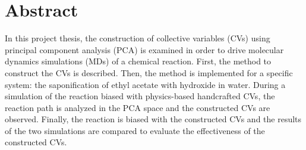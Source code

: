 \chapter*{Abstract}

In this project thesis, the construction of collective variables (CVs) using principal component analysis (PCA) is examined in order to drive molecular dynamics simulations (MDs) of a chemical reaction.
First, the method to construct the CVs is described. 
Then, the method is implemented for a specific system: the saponification of ethyl acetate with hydroxide in water. 
During a simulation of the reaction biased with physics-based handcrafted CVs, the reaction path is analyzed in the PCA space and the constructed CVs are observed. 
Finally, the reaction is biased with the constructed CVs and the results of the two simulations are compared to evaluate the effectiveness of the constructed CVs.

\vspace*{\fill}
\clearpage


\vspace*{\fill}